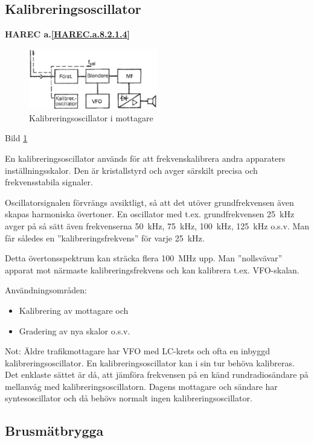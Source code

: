 \subsection{Kalibreringsoscillator}
\textbf{
HAREC a.\ref{HAREC.a.8.2.1.4}\label{myHAREC.a.8.2.1.4}
}

\begin{figure}
  \includegraphics[width=0.5\textwidth]{images/cropped_pdfs/bild_2_8-07.pdf}
  \caption{Kalibreringsoscillator i mottagare}
  \label{fig:bildII8-7}
\end{figure}

Bild \ref{fig:bildII8-7}

En kalibreringsoscillator används för att frekvenskalibrera andra
apparaters inställningsskalor.  Den är kristallstyrd och avger
särskilt precisa och frekvensstabila signaler.

Oscillatorsignalen förvrängs avsiktligt, så att det utöver
grundfrekvensen även skapas harmoniska övertoner.
En oscillator med t.ex. grundfrekvensen 25~kHz avger på så sätt även
frekvenserna 50~kHz, 75~kHz, 100~kHz, 125~kHz o.s.v.
Man får således en ''kalibreringsfrekvens'' för varje 25~kHz.

Detta övertonsspektrum kan sträcka flera 100~MHz upp. Man
''nollsvävar'' apparat mot närmaste kalibreringsfrekvens och kan
kalibrera t.ex. VFO-skalan.

Användningsområden:
\begin{itemize}
\item Kalibrering av mottagare och
\item Gradering av nya skalor o.s.v.
\end{itemize}

Not: Äldre trafikmottagare har VFO med LC-krets och ofta en inbyggd
kalibreringsoscillator. En kalibreringsoscillator kan i sin tur behöva
kalibreras. Det enklaste sättet är då, att jämföra frekvensen på en
känd rundradiosändare på mellanvåg med kalibreringsoscillatorn.
Dagens mottagare och sändare har syntesoscillator och då behövs
normalt ingen kalibreringsoscillator.

\subsection{Brusmätbrygga}

